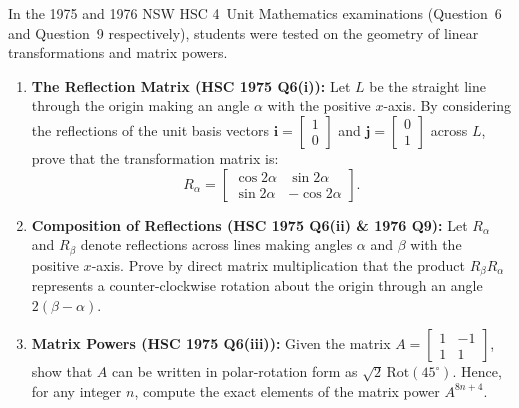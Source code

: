 \begin{problem}
In the 1975 and 1976 NSW HSC 4~Unit Mathematics examinations (Question~6 and Question~9 respectively), students were tested on the geometry of linear transformations and matrix powers.

\begin{enumerate}[label=\textbf{(\alph*)}]
    \item \textbf{The Reflection Matrix (HSC 1975 Q6(i)):}
    Let $L$ be the straight line through the origin making an angle $\alpha$ with the positive $x$-axis. By considering the reflections of the unit basis vectors $\mathbf{i} = \begin{bmatrix} 1 \\ 0 \end{bmatrix}$ and $\mathbf{j} = \begin{bmatrix} 0 \\ 1 \end{bmatrix}$ across $L$, prove that the transformation matrix is:
    \[
    R_\alpha = \begin{bmatrix} \cos 2\alpha & \sin 2\alpha \\ \sin 2\alpha & -\cos 2\alpha \end{bmatrix}.
    \]

    \item \textbf{Composition of Reflections (HSC 1975 Q6(ii) \& 1976 Q9):}
    Let $R_\alpha$ and $R_\beta$ denote reflections across lines making angles $\alpha$ and $\beta$ with the positive $x$-axis. Prove by direct matrix multiplication that the product $R_\beta R_\alpha$ represents a counter-clockwise rotation about the origin through an angle $2(\beta - \alpha)$.

    \item \textbf{Matrix Powers (HSC 1975 Q6(iii)):}
    Given the matrix $A = \begin{bmatrix} 1 & -1 \\ 1 & 1 \end{bmatrix}$, show that $A$ can be written in polar-rotation form as $\sqrt{2}\,\text{Rot}(45^\circ)$. Hence, for any integer $n$, compute the exact elements of the matrix power $A^{8n+4}$.
\end{enumerate}
\end{problem}

